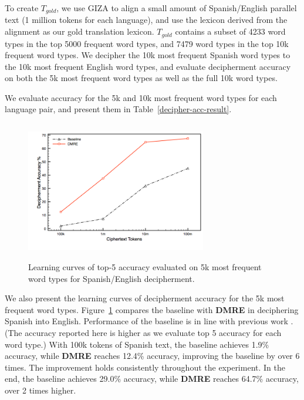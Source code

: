 To create $T_{gold}$, we use GIZA to align a small amount of Spanish/English parallel text (1 million tokens for each language), and use the lexicon derived from the alignment as our gold translation lexicon. $T_{gold}$ contains a subset of 4233 word types in the top 5000 frequent word types, and 7479 word types in the top 10k frequent word types. We decipher the 10k most frequent Spanish word types to the 10k most frequent English word types, and evaluate decipherment accuracy on both the 5k most frequent word types as well as the full 10k word types.

We evaluate accuracy for the 5k and 10k most frequent word types for each language pair, and present them in Table~\ref{decipher-acc-result}.


 \begin{figure}[!ht]
  \centering
  \includegraphics[width=3.1in,height=2.4in]{es_en_curve}
  \caption{Learning curves of top-5 accuracy evaluated on 5k most frequent word types for Spanish/English decipherment.}
\label{es-en-curve}
\end{figure}

We also present the learning curves of decipherment accuracy for the 5k most frequent word types. Figure~\ref{es-en-curve} compares the baseline with \textbf{DMRE} in deciphering Spanish into English. Performance of the baseline is in line with previous work \cite{dou-knight:2013:EMNLP}. (The accuracy reported here is higher as we evaluate top 5 accuracy for each word type.) With 100k tokens of Spanish text, the baseline achieves 1.9\% accuracy, while \textbf{DMRE} reaches 12.4\% accuracy, improving the baseline by over 6 times. The improvement holds consistently throughout the experiment. In the end, the baseline achieves 29.0\% accuracy, while \textbf{DMRE} reaches 64.7\% accuracy, over 2 times higher. 

